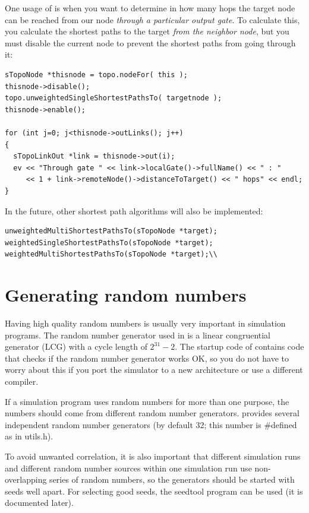 One usage of  is when you want to determine in how many 
hops the target node can be reached from our node \textit{through 
a particular output gate}. To calculate this, you calculate the 
shortest paths to the target \textit{from the neighbor node}, but 
you must disable the current node to prevent the shortest paths 
from going through it:

\begin{Verbatim}
sTopoNode *thisnode = topo.nodeFor( this );
thisnode->disable();
topo.unweightedSingleShortestPathsTo( targetnode );
thisnode->enable();

for (int j=0; j<thisnode->outLinks(); j++)
{
  sTopoLinkOut *link = thisnode->out(i);
  ev << "Through gate " << link->localGate()->fullName() << " : "
     << 1 + link->remoteNode()->distanceToTarget() << " hops" << endl;
}
\end{Verbatim}

In the future, other shortest path algorithms will also be implemented:

\begin{Verbatim}
unweightedMultiShortestPathsTo(sTopoNode *target);
weightedSingleShortestPathsTo(sTopoNode *target);
weightedMultiShortestPathsTo(sTopoNode *target);\\
\end{Verbatim}



\section{Generating random numbers}

Having high quality random numbers is usually
very important in simulation programs. The random number generator
used in {\opp} is a linear congruential generator (LCG) with a cycle length of $2^{31}-2$. The
startup code of {\opp} contains code that checks if the random number
generator works OK, so you do not have to worry about this if you port
the simulator to a new architecture or use a different compiler.


If a simulation program uses random numbers for more than one purpose,
the numbers should come from different random number generators.
{\opp} provides several independent random number generators (by
default 32; this number is \#defined as
 in utils.h).


To avoid unwanted correlation, it is also important that different 
simulation runs and different random number sources within one 
simulation run use non-overlapping series of random numbers, 
so the generators should be started with seeds well apart. For 
selecting good seeds, the seedtool program can be used (it is 
documented later).

